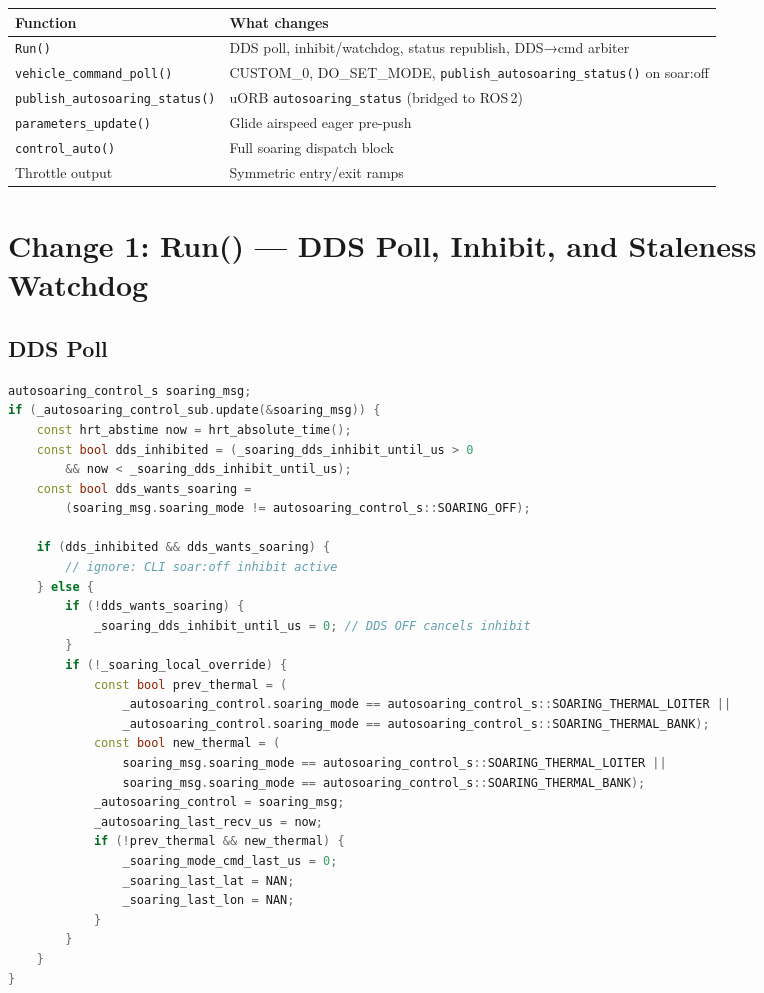 \documentclass[12pt,a4paper]{article}
\begin{document}
\begin{center}
\begin{tabular}{ll}
\toprule
Function & What changes \\
\midrule
\texttt{Run()} & DDS poll, inhibit/watchdog, status republish, DDS→cmd arbiter \\
\texttt{vehicle\_command\_poll()} & CUSTOM\_0, DO\_SET\_MODE, \texttt{publish\_autosoaring\_status()} on soar:off \\
\texttt{publish\_autosoaring\_status()} & uORB \texttt{autosoaring\_status} (bridged to ROS\,2) \\
\texttt{parameters\_update()} & Glide airspeed eager pre-push \\
\texttt{control\_auto()} & Full soaring dispatch block \\
Throttle output & Symmetric entry/exit ramps \\
\bottomrule
\end{tabular}
\end{center}

\section{Change 1: Run() --- DDS Poll, Inhibit, and Staleness Watchdog}
\label{sec:dds}

\subsection{DDS Poll}

\begin{lstlisting}[language=C++]
autosoaring_control_s soaring_msg;
if (_autosoaring_control_sub.update(&soaring_msg)) {
    const hrt_abstime now = hrt_absolute_time();
    const bool dds_inhibited = (_soaring_dds_inhibit_until_us > 0
        && now < _soaring_dds_inhibit_until_us);
    const bool dds_wants_soaring =
        (soaring_msg.soaring_mode != autosoaring_control_s::SOARING_OFF);

    if (dds_inhibited && dds_wants_soaring) {
        // ignore: CLI soar:off inhibit active
    } else {
        if (!dds_wants_soaring) {
            _soaring_dds_inhibit_until_us = 0; // DDS OFF cancels inhibit
        }
        if (!_soaring_local_override) {
            const bool prev_thermal = (
                _autosoaring_control.soaring_mode == autosoaring_control_s::SOARING_THERMAL_LOITER ||
                _autosoaring_control.soaring_mode == autosoaring_control_s::SOARING_THERMAL_BANK);
            const bool new_thermal = (
                soaring_msg.soaring_mode == autosoaring_control_s::SOARING_THERMAL_LOITER ||
                soaring_msg.soaring_mode == autosoaring_control_s::SOARING_THERMAL_BANK);
            _autosoaring_control = soaring_msg;
            _autosoaring_last_recv_us = now;
            if (!prev_thermal && new_thermal) {
                _soaring_mode_cmd_last_us = 0;
                _soaring_last_lat = NAN;
                _soaring_last_lon = NAN;
            }
        }
    }
}
\end{lstlisting}
\end{document}
